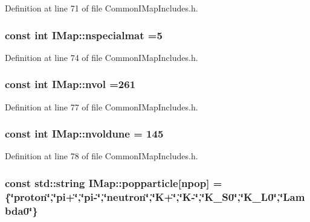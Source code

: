 Definition at line 71 of file Common\-I\-Map\-Includes.\-h.

\hypertarget{namespace_i_map_a7f2a143d764d8e7e548e79da73e4ad89}{
\subsubsection[{nspecialmat}]{\setlength{\rightskip}{0pt plus 5cm}const int I\-Map\-::nspecialmat =5\hspace{0.3cm}{\ttfamily [static]}}}\label{namespace_i_map_a7f2a143d764d8e7e548e79da73e4ad89}


Definition at line 74 of file Common\-I\-Map\-Includes.\-h.

\hypertarget{namespace_i_map_a9e84d12837376356ab193324552af029}{
\subsubsection[{nvol}]{\setlength{\rightskip}{0pt plus 5cm}const int I\-Map\-::nvol =261\hspace{0.3cm}{\ttfamily [static]}}}\label{namespace_i_map_a9e84d12837376356ab193324552af029}


Definition at line 77 of file Common\-I\-Map\-Includes.\-h.

\hypertarget{namespace_i_map_a1c9b3e0953e2482ba19063292d111bb2}{
\subsubsection[{nvoldune}]{\setlength{\rightskip}{0pt plus 5cm}const int I\-Map\-::nvoldune = 145\hspace{0.3cm}{\ttfamily [static]}}}\label{namespace_i_map_a1c9b3e0953e2482ba19063292d111bb2}


Definition at line 78 of file Common\-I\-Map\-Includes.\-h.

\hypertarget{namespace_i_map_ae46c7923bde764e23980ee483272f229}{
\subsubsection[{popparticle}]{\setlength{\rightskip}{0pt plus 5cm}const std\-::string I\-Map\-::popparticle\mbox{[}{\bf npop}\mbox{]} = \{\char`\"{}proton\char`\"{},\char`\"{}pi+\char`\"{},\char`\"{}pi-\/\char`\"{},\char`\"{}neutron\char`\"{},\char`\"{}K+\char`\"{},\char`\"{}K-\/\char`\"{},\char`\"{}K\-\_\-\-S0\char`\"{},\char`\"{}K\-\_\-\-L0\char`\"{},\char`\"{}Lambda0\char`\"{}\}\hspace{0.3cm}{\ttfamily [static]}}}\label{namespace_i_map_ae46c7923bde764e23980ee483272f229}



